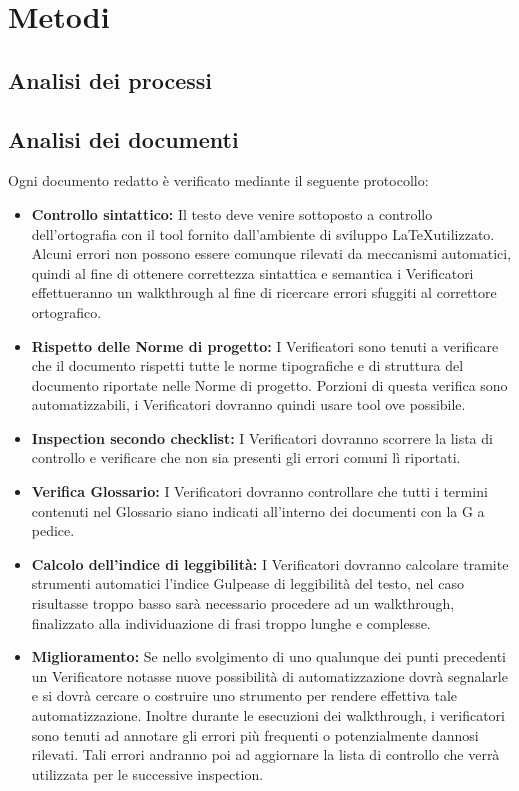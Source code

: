\documentclass[a4paper]{report}
\begin{document}
			
			
			
		\section{Metodi}
			
			\subsection{Analisi dei processi}
			\subsection{Analisi dei documenti}
				Ogni documento redatto è verificato mediante il seguente protocollo:
				\begin{itemize}
					\item \textbf{Controllo sintattico:} Il testo deve venire sottoposto a controllo dell'ortografia con il tool
					fornito dall'ambiente di sviluppo \LaTeX utilizzato. Alcuni errori non possono essere comunque rilevati da
					meccanismi automatici, quindi al fine di ottenere correttezza sintattica e semantica i Verificatori
					effettueranno un walkthrough al fine di ricercare errori sfuggiti al correttore ortografico.
					\item \textbf{Rispetto delle Norme di progetto:} I Verificatori sono tenuti a verificare che il documento
					rispetti tutte le norme tipografiche e di struttura del documento riportate nelle Norme di progetto. Porzioni
					di questa verifica sono automatizzabili, i Verificatori dovranno quindi usare tool ove possibile. 
					\item \textbf{Inspection secondo checklist:} I Verificatori dovranno scorrere la lista di controllo e
					verificare che non sia presenti gli errori comuni lì riportati.
					\item \textbf{Verifica Glossario:} I Verificatori dovranno controllare che tutti i termini contenuti nel 
					Glossario siano indicati all'interno dei documenti con la G a pedice. 
					\item \textbf{Calcolo dell'indice di leggibilità:} I Verificatori dovranno calcolare tramite strumenti
					automatici l'indice Gulpease di leggibilità del testo, nel caso risultasse troppo basso sarà necessario
					procedere ad un walkthrough, finalizzato alla individuazione di frasi troppo lunghe e complesse.
					\item \textbf{Miglioramento:} Se nello svolgimento di uno qualunque dei punti precedenti un Verificatore
					notasse nuove possibilità di automatizzazione dovrà segnalarle e si dovrà cercare o costruire uno strumento per
					rendere effettiva tale automatizzazione. Inoltre durante le esecuzioni dei walkthrough, i verificatori sono
					tenuti ad annotare gli errori più frequenti o potenzialmente dannosi rilevati. Tali errori andranno poi ad
					aggiornare la lista di controllo che verrà utilizzata per le successive inspection.
				\end{itemize}								
			
\end{document}
